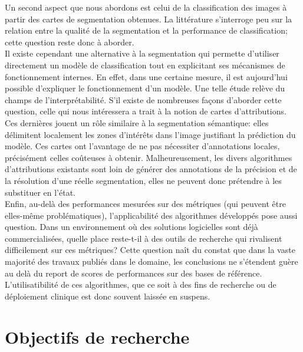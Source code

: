 Un second aspect que nous abordons est celui de la classification des images à partir des cartes de segmentation obtenues. La littérature s'interroge peu sur la relation entre la qualité de la segmentation et la performance de classification; cette question reste donc à aborder.
\\
Il existe cependant une alternative à la segmentation qui permette d'utiliser directement un modèle de classification tout en explicitant ses mécanismes de fonctionnement internes. En effet, dans une certaine mesure, il est aujourd'hui possible d'expliquer le fonctionnement d'un modèle. Une telle étude relève du champs de l'interprétabilité. S'il existe de nombreuses façons d'aborder cette question, celle qui nous intéressera a trait à la notion de cartes d'attributions. Ces dernières jouent un rôle similaire à la segmentation sémantique: elles délimitent localement les zones d'intérêts dans l'image justifiant la prédiction du modèle. Ces cartes ont l'avantage de ne pas nécessiter d'annotations locales, précisément celles coûteuses à obtenir. Malheureusement, les divers algorithmes d'attributions existants sont loin de générer des annotations de la précision et de la résolution d'une réelle segmentation, elles ne peuvent donc prétendre à les substituer en l'état.
\\
Enfin, au-delà des performances mesurées sur des métriques (qui peuvent être elles-même problématiques), l'applicabilité des algorithmes développés pose aussi question. Dans un environnement où des solutions logicielles sont déjà commercialisées, quelle place reste-t-il à des outils de recherche qui rivalisent difficilement sur ces métriques?
Cette question naît du constat que dans la vaste majorité des travaux publiés dans le domaine, les conclusions ne s'étendent guère au delà du report de scores de performances sur des bases de référence. L'utilisatibilité de ces algorithmes, que ce soit à des fins de recherche ou de déploiement clinique est donc souvent laissée en suspens. 
\section{Objectifs de recherche}  %


